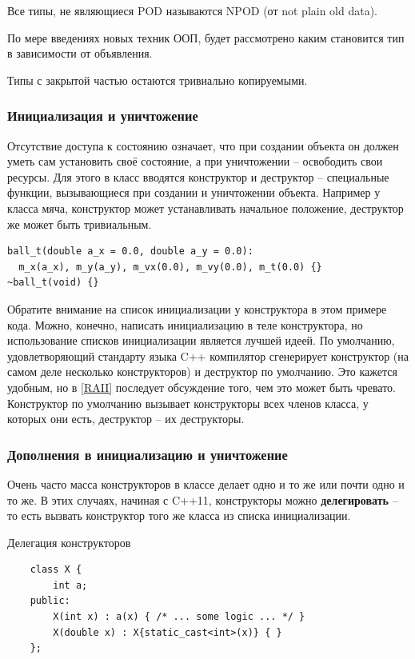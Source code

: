 \documentclass[a4paper,12pt,oneside]{article}
\begin{document}
Все типы, не являющиеся POD называются NPOD (от not plain old data).

По мере введениях новых техник ООП, будет рассмотрено каким становится тип в зависимости от объявления.

Типы с закрытой частью остаются тривиально копируемыми.

\subsubsection{Инициализация и уничтожение}\label{ConstrDestr}

Отсутствие доступа к состоянию означает, что при создании объекта он должен уметь сам установить своё состояние, а при уничтожении – освободить свои ресурсы. Для этого в класс вводятся конструктор и деструктор – специальные функции, вызывающиеся при создании и уничтожении объекта. Например у класса мяча, конструктор может устанавливать начальное положение, деструктор же может быть тривиальным.

\begin{lstlisting}
ball_t(double a_x = 0.0, double a_y = 0.0):
  m_x(a_x), m_y(a_y), m_vx(0.0), m_vy(0.0), m_t(0.0) {}
~ball_t(void) {}
\end{lstlisting}

Обратите внимание на список инициализации у конструктора в этом примере кода. Можно, конечно, написать инициализацию в теле конструктора, но использование списков инициализации является лучшей идеей. По умолчанию, удовлетворяющий стандарту языка C++ компилятор сгенерирует конструктор (на самом деле несколько конструкторов) и деструктор по умолчанию. Это кажется удобным, но в \ref{RAII} последует обсуждение того, чем это может быть чревато. Конструктор по умолчанию вызывает конструкторы всех членов класса, у которых они есть, деструктор -- их деструкторы.

\subsubsection{Дополнения в инициализацию и уничтожение}\label{ConstrDestrAddition}

Очень часто масса конструкторов в классе делает одно и то же или почти одно и то же. В этих случаях, начиная с C++11, конструкторы можно \textbf{делегировать} -- то есть вызвать конструктор того же класса из списка инициализации.

Делегация конструкторов

\begin{lstlisting}
    class X {
        int a;
    public:
        X(int x) : a(x) { /* ... some logic ... */ }
        X(double x) : X{static_cast<int>(x)} { }
    };
\end{lstlisting}
\end{document}
